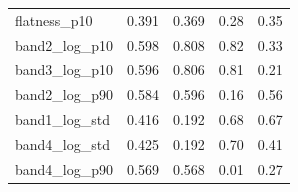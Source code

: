 \documentclass[11pt,a4paper]{article}
\begin{document}
\begin{center}
\begin{longtable}{>{\raggedright\arraybackslash}p{4.20cm}>{\raggedleft\arraybackslash}p{2.55cm}>{\raggedleft\arraybackslash}p{2.55cm}>{\raggedleft\arraybackslash}p{2.55cm}>{\raggedleft\arraybackslash}p{2.55cm}}
\hspace{0pt}flatness\_\allowbreak{}p10 & \hspace{0pt}0.391 & \hspace{0pt}0.369 & \hspace{0pt}0.28 & \hspace{0pt}0.35\\
\hspace{0pt}band2\_\allowbreak{}log\_\allowbreak{}p10 & \hspace{0pt}0.598 & \hspace{0pt}0.808 & \hspace{0pt}0.82 & \hspace{0pt}0.33\\
\hspace{0pt}band3\_\allowbreak{}log\_\allowbreak{}p10 & \hspace{0pt}0.596 & \hspace{0pt}0.806 & \hspace{0pt}0.81 & \hspace{0pt}0.21\\
\hspace{0pt}band2\_\allowbreak{}log\_\allowbreak{}p90 & \hspace{0pt}0.584 & \hspace{0pt}0.596 & \hspace{0pt}0.16 & \hspace{0pt}0.56\\
\hspace{0pt}band1\_\allowbreak{}log\_\allowbreak{}std & \hspace{0pt}0.416 & \hspace{0pt}0.192 & \hspace{0pt}0.68 & \hspace{0pt}0.67\\
\hspace{0pt}band4\_\allowbreak{}log\_\allowbreak{}std & \hspace{0pt}0.425 & \hspace{0pt}0.192 & \hspace{0pt}0.70 & \hspace{0pt}0.41\\
\hspace{0pt}band4\_\allowbreak{}log\_\allowbreak{}p90 & \hspace{0pt}0.569 & \hspace{0pt}0.568 & \hspace{0pt}0.01 & \hspace{0pt}0.27\\

\end{longtable}
\end{center}
\end{document}
